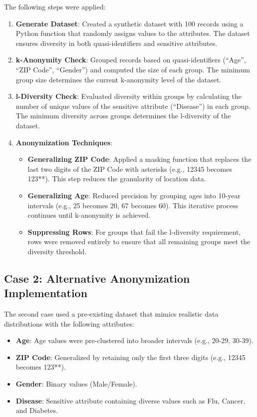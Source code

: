 \documentclass[conference]{IEEEtran}
\begin{document}
	The following steps were applied:
	\begin{enumerate}
		\item \textbf{Generate Dataset}: Created a synthetic dataset with 100 records using a Python function that randomly assigns values to the attributes. The dataset ensures diversity in both quasi-identifiers and sensitive attributes.
		\item \textbf{k-Anonymity Check}: Grouped records based on quasi-identifiers (``Age'', ``ZIP Code'', ``Gender'') and computed the size of each group. The minimum group size determines the current k-anonymity level of the dataset.
		\item \textbf{l-Diversity Check}: Evaluated diversity within groups by calculating the number of unique values of the sensitive attribute (``Disease'') in each group. The minimum diversity across groups determines the l-diversity of the dataset.
		\item \textbf{Anonymization Techniques}:
		\begin{itemize}
			\item \textbf{Generalizing ZIP Code}: Applied a masking function that replaces the last two digits of the ZIP Code with asterisks (e.g., 12345 becomes 123**). This step reduces the granularity of location data.
			\item \textbf{Generalizing Age}: Reduced precision by grouping ages into 10-year intervals (e.g., 25 becomes 20, 67 becomes 60). This iterative process continues until k-anonymity is achieved.
			\item \textbf{Suppressing Rows}: For groups that fail the l-diversity requirement, rows were removed entirely to ensure that all remaining groups meet the diversity threshold.
		\end{itemize}
	\end{enumerate}
	
	\subsection{Case 2: Alternative Anonymization Implementation}
	The second case used a pre-existing dataset that mimics realistic data distributions with the following attributes:
	\begin{itemize}
		\item \textbf{Age}: Age values were pre-clustered into broader intervals (e.g., 20-29, 30-39).
		\item \textbf{ZIP Code}: Generalized by retaining only the first three digits (e.g., 12345 becomes 123**).
		\item \textbf{Gender}: Binary values (Male/Female).
		\item \textbf{Disease}: Sensitive attribute containing diverse values such as Flu, Cancer, and Diabetes.
	\end{itemize}
	
\end{document}
